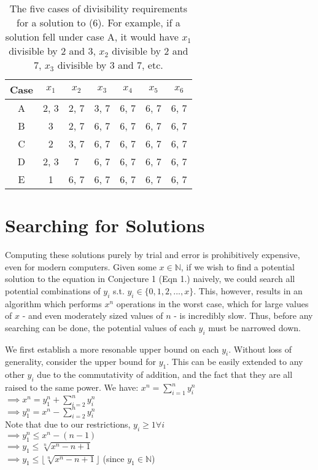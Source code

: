 \documentclass{article}
\begin{document}
\begin{flushleft}
\begin{table}
    \centering
    \begin{tabular}{|c|c|c|c|c|c|c|}
    \hline
        Case & $x_1$ & $x_2$ & $x_3$ & $x_4$ & $x_5$ & $x_6$ \\
    \hline\hline
        A & 2, 3 & 2, 7 & 3, 7 & 6, 7 & 6, 7 & 6, 7 \\
    \hline
        B & 3 & 2, 7 & 6, 7 & 6, 7 & 6, 7 & 6, 7 \\
    \hline
        C & 2 & 3, 7 & 6, 7 & 6, 7 & 6, 7 & 6, 7 \\
    \hline 
        D & 2, 3 & 7 & 6, 7 & 6, 7 & 6, 7 & 6, 7 \\
    \hline 
        E & 1 & 6, 7 & 6, 7 & 6, 7 & 6, 7 & 6, 7 \\
    \hline
    \end{tabular}
    \caption{The five cases of divisibility requirements for a solution to (6). For example, if a solution fell under case A, it would have $x_1$ divisible by 2 and 3, $x_2$ divisible by 2 and 7, $x_3$ divisible by 3 and 7, etc. }
    \label{tab:my_label}
\end{table}

\section{Searching for Solutions}
Computing these solutions purely by trial and error is prohibitively expensive, even for modern computers. Given some $x \in \mathbb{N}$, if we wish to find a potential solution to the equation in Conjecture 1 (Eqn 1.) naively, we could search all potential combinations of $y_i$ s.t. $y_i \in \{0, 1, 2, ..., x\}$. This, however, results in an algorithm which performs $x^n$ operations in the worst case, which for large values of $x$ - and even moderately sized values of $n$ - is incredibly slow. Thus, before any searching can be done, the potential values of each $y_i$ must be narrowed down.

\vspace{.1in}

We first establish a more resonable upper bound on each $y_i$. Without loss of generality, consider the upper bound for $y_1$. This can be easily extended to any other $y_i$ due to the commutativity of addition, and the fact that they are all raised to the same power. We have: $x^n = \sum^{n}_{i=1}y_i^n$ \\
\hspace{.15in} $\implies x^n = y_1^n + \sum_{i = 2}^ny_i^n$ \\
\hspace{.15in} $\implies y_1^n = x^n - \sum_{i = 2}^ny_i^n$ \\
Note that due to our restrictions, $y_i \geq 1 \forall i$ \\
\hspace{.15in} $\implies y_1^n \leq x^n - (n - 1)$ \\
\hspace{.15in} $\implies y_1 \leq \sqrt[n]{x^n - n + 1}$ \\
\hspace{.15in} $\implies y_1 \leq \lfloor\sqrt[n]{x^n - n + 1}\rfloor$ (since $y_1 \in \mathbb{N}$)


\end{flushleft}
\end{document}

